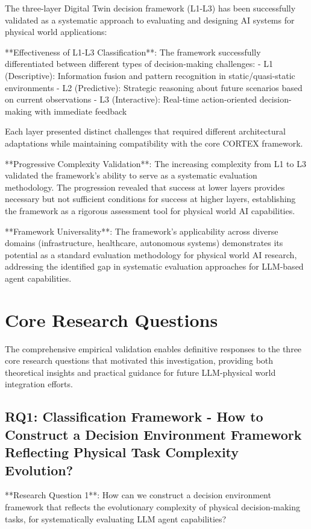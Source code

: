 The three-layer Digital Twin decision framework (L1-L3) has been successfully validated as a systematic approach to evaluating and designing AI systems for physical world applications:

**Effectiveness of L1-L3 Classification**: The framework successfully differentiated between different types of decision-making challenges:
- L1 (Descriptive): Information fusion and pattern recognition in static/quasi-static environments
- L2 (Predictive): Strategic reasoning about future scenarios based on current observations
- L3 (Interactive): Real-time action-oriented decision-making with immediate feedback

Each layer presented distinct challenges that required different architectural adaptations while maintaining compatibility with the core CORTEX framework.

**Progressive Complexity Validation**: The increasing complexity from L1 to L3 validated the framework's ability to serve as a systematic evaluation methodology. The progression revealed that success at lower layers provides necessary but not sufficient conditions for success at higher layers, establishing the framework as a rigorous assessment tool for physical world AI capabilities.

**Framework Universality**: The framework's applicability across diverse domains (infrastructure, healthcare, autonomous systems) demonstrates its potential as a standard evaluation methodology for physical world AI research, addressing the identified gap in systematic evaluation approaches for LLM-based agent capabilities.

\section{Core Research Questions}

The comprehensive empirical validation enables definitive responses to the three core research questions that motivated this investigation, providing both theoretical insights and practical guidance for future LLM-physical world integration efforts.

\subsection{RQ1: Classification Framework - How to Construct a Decision Environment Framework Reflecting Physical Task Complexity Evolution?}

**Research Question 1**: How can we construct a decision environment framework that reflects the evolutionary complexity of physical decision-making tasks, for systematically evaluating LLM agent capabilities?

